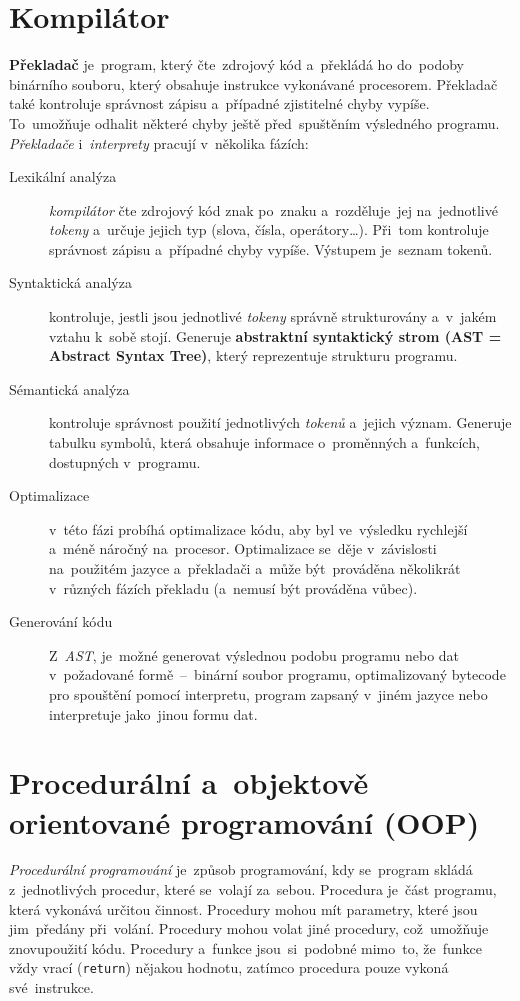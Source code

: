 \documentclass[11pt,a4paper]{report}
\begin{document}
        \section{Kompilátor}
            \textbf{Překladač} je~program, který čte~zdrojový kód a~překládá ho do~podoby binárního souboru, který obsahuje instrukce vykonávané procesorem. Překladač také kontroluje správnost zápisu a~případné zjistitelné chyby vypíše. To~umožňuje odhalit některé chyby ještě před~spuštěním výsledného programu.
            \emph{Překladače} i~\emph{interprety} pracují v~několika fázích:
            \begin{description}
                \item[Lexikální analýza] \emph{kompilátor} čte zdrojový kód znak po~znaku a~rozděluje~jej na~jednotlivé \emph{tokeny} a~určuje jejich typ (slova, čísla, operátory\dots). Při~tom kontroluje správnost zápisu a~případné chyby vypíše. Výstupem je~seznam tokenů.
                \item[Syntaktická analýza] kontroluje, jestli jsou jednotlivé \emph{tokeny} správně strukturovány a~v~jakém vztahu k~sobě stojí. Generuje \textbf{abstraktní syntaktický strom (AST = Abstract Syntax Tree)}, který reprezentuje strukturu programu.
                \item[Sémantická analýza] kontroluje správnost použití jednotlivých \emph{tokenů} a~jejich význam. Generuje tabulku symbolů, která obsahuje informace o~proměnných a~funkcích, dostupných v~programu.
                \item[Optimalizace] v~této fázi probíhá optimalizace kódu, aby byl ve~výsledku rychlejší a~méně náročný na~procesor. Optimalizace se~děje v~závislosti na~použitém jazyce a~překladači a~může být~prováděna několikrát v~různých fázích překladu (a~nemusí být prováděna vůbec).
                \item[Generování kódu] Z~\emph{AST}, je~možné generovat výslednou podobu programu nebo dat v~požadované formě~--~binární soubor programu, optimalizovaný bytecode pro spouštění pomocí interpretu, program zapsaný v~jiném jazyce nebo interpretuje jako~jinou formu dat.~\cite{baeldungCompilersWork, compilers}
            \end{description}

        \section{Procedurální a~objektově orientované programování (OOP)}
            \emph{Procedurální programování} je~způsob programování, kdy se~program skládá z~jednotlivých procedur, které se~volají za~sebou. Procedura je~část programu, která vykonává určitou činnost. Procedury mohou mít parametry, které jsou jim~předány při~volání. Procedury mohou volat jiné procedury, což~umožňuje znovupoužití kódu. Procedury a~funkce jsou~si~podobné mimo~to, že~funkce vždy vrací (\texttt{return}) nějakou hodnotu, zatímco procedura pouze vykoná své~instrukce.
            
\end{document}

